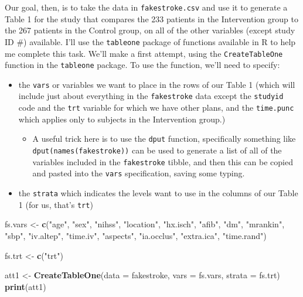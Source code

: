 \documentclass[]{book}
\newenvironment{Shaded}{\begin{snugshade}}{\end{snugshade}}
\newcommand{\KeywordTok}[1]{\textcolor[rgb]{0.13,0.29,0.53}{\textbf{#1}}}
\newcommand{\DataTypeTok}[1]{\textcolor[rgb]{0.13,0.29,0.53}{#1}}
\newcommand{\StringTok}[1]{\textcolor[rgb]{0.31,0.60,0.02}{#1}}
\newcommand{\NormalTok}[1]{#1}
\providecommand{\tightlist}{%
  \setlength{\itemsep}{0pt}\setlength{\parskip}{0pt}}
\theoremstyle{definition}
\theoremstyle{definition}
\theoremstyle{definition}
\theoremstyle{remark}
\begin{document}
Our goal, then, is to take the data in \texttt{fakestroke.csv} and use
it to generate a Table 1 for the study that compares the 233 patients in
the Intervention group to the 267 patients in the Control group, on all
of the other variables (except study ID \#) available. I'll use the
\texttt{tableone} package of functions available in R to help me
complete this task. We'll make a first attempt, using the
\texttt{CreateTableOne} function in the \texttt{tableone} package. To
use the function, we'll need to specify:

\begin{itemize}
\tightlist
\item
  the \texttt{vars} or variables we want to place in the rows of our
  Table 1 (which will include just about everything in the
  \texttt{fakestroke} data except the \texttt{studyid} code and the
  \texttt{trt} variable for which we have other plans, and the
  \texttt{time.punc} which applies only to subjects in the Intervention
  group.)

  \begin{itemize}
  \tightlist
  \item
    A useful trick here is to use the \texttt{dput} function,
    specifically something like \texttt{dput(names(fakestroke))} can be
    used to generate a list of all of the variables included in the
    \texttt{fakestroke} tibble, and then this can be copied and pasted
    into the \texttt{vars} specification, saving some typing.
  \end{itemize}
\item
  the \texttt{strata} which indicates the levels want to use in the
  columns of our Table 1 (for us, that's \texttt{trt})
\end{itemize}

\begin{Shaded}
\begin{Highlighting}[]
\NormalTok{fs.vars <-}\StringTok{ }\KeywordTok{c}\NormalTok{(}\StringTok{"age"}\NormalTok{, }\StringTok{"sex"}\NormalTok{, }\StringTok{"nihss"}\NormalTok{, }\StringTok{"location"}\NormalTok{, }
          \StringTok{"hx.isch"}\NormalTok{, }\StringTok{"afib"}\NormalTok{, }\StringTok{"dm"}\NormalTok{, }\StringTok{"mrankin"}\NormalTok{, }\StringTok{"sbp"}\NormalTok{,}
          \StringTok{"iv.altep"}\NormalTok{, }\StringTok{"time.iv"}\NormalTok{, }\StringTok{"aspects"}\NormalTok{, }
          \StringTok{"ia.occlus"}\NormalTok{, }\StringTok{"extra.ica"}\NormalTok{, }\StringTok{"time.rand"}\NormalTok{)}

\NormalTok{fs.trt <-}\StringTok{ }\KeywordTok{c}\NormalTok{(}\StringTok{"trt"}\NormalTok{)}

\NormalTok{att1 <-}\StringTok{ }\KeywordTok{CreateTableOne}\NormalTok{(}\DataTypeTok{data =}\NormalTok{ fakestroke, }
                       \DataTypeTok{vars =}\NormalTok{ fs.vars, }
                       \DataTypeTok{strata =}\NormalTok{ fs.trt)}
\KeywordTok{print}\NormalTok{(att1)}
\end{Highlighting}
\end{Shaded}
\end{document}
